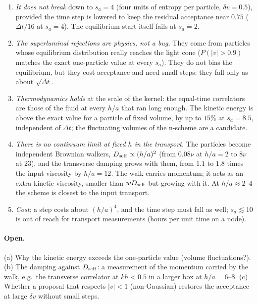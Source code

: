 \documentclass[11pt,aps,preprint,nofootinbib,superscriptaddress,tightenlines]{revtex4-2}
\let\oldparagraph\paragraph
\renewcommand{\paragraph}{\par\bigskip\oldparagraph}
\begin{document}
\begin{enumerate}
\item \emph{It does not break} down to $s_a=4$ (four units of entropy per particle, $\delta v=0.5$), provided
  the time step is lowered to keep the residual acceptance near $0.75$ ($\Delta t/16$ at $s_a=4$).  The
  equilibrium start itself fails at $s_a=2$.
\item \emph{The superluminal rejections are physics, not a bug.}  They come from particles whose
  equilibrium distribution really reaches the light cone ($P(|v|>0.9)$ matches the exact one-particle
  value at every $s_a$).  They do not bias the equilibrium, but they cost acceptance and need small
  steps: they fall only as about $\sqrt{\Delta t}$.
\item \emph{Thermodynamics holds} at the scale of the kernel: the equal-time correlators are those of
  the fluid at every $h/a$ that ran long enough.  The kinetic energy is above the exact value for a
  particle of fixed volume, by up to $15\%$ at $s_a=8.5$, independent of $\Delta t$; the fluctuating
  volumes of the n-scheme are a candidate.
\item \emph{There is no continuum limit at fixed $h$ in the transport.}  The particles become
  independent Brownian walkers, $D_{\rm self}\propto(h/a)^2$ (from $0.08\nu$ at $h/a=2$ to $8\nu$ at $23$), and the
  transverse damping grows with them, from $1.1$ to $1.8$ times the input viscosity by $h/a=12$.  The
  walk carries momentum; it acts as an extra kinetic viscosity, smaller than $wD_{\rm self}$ but
  growing with it.  At $h/a\approx2$--$4$ the scheme is closest to the input transport.
\item \emph{Cost}: a step costs about $(h/a)^4$, and the time step must fall as well; $s_a\lesssim10$
  is out of reach for transport measurements (hours per unit time on a node).
\end{enumerate}

\paragraph{Open.}  (a) Why the kinetic energy exceeds the one-particle value (volume fluctuations?).
(b) The damping against $D_{\rm self}$: a measurement of the momentum carried by the walk, e.g.\ the
transverse correlator at $kh<0.5$ in a larger box at $h/a=6$--$8$.  (c) Whether a proposal that respects
$|v|<1$ (non-Gaussian) restores the acceptance at large $\delta v$ without small steps.
\end{document}
